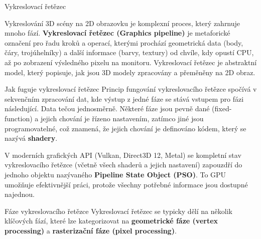 \chap Vykreslovací řetězec

Vykreslování 3D scény na 2D obrazovku je komplexní proces, který zahrnuje mnoho fází. {\bf Vykreslovací řetězec (Graphics pipeline)} je metaforické označení pro řadu kroků a operací, kterými prochází geometrická data (body, čáry, trojúhelníky) a další informace (barvy, textury) od chvíle, kdy opustí CPU, až po zobrazení výsledného pixelu na monitoru. Vykreslovací řetězec je abstraktní model, který popisuje, jak jsou 3D modely zpracovány a přeměněny na 2D obraz. 

\sec Jak fuguje vykreslovací řetězec
Princip fungování vykreslovacího řetězce spočívá v sekvenčním zpracování dat, kde výstup z jedné fáze se stává vstupem pro fázi následující. Data tečou jednosměrně. Některé fáze jsou pevně dané (fixed-function) a jejich chování je řízeno nastavením, zatímco jiné jsou programovatelné, což znamená, že jejich chování je definováno kódem, který se nazývá {\bf shadery}.

V moderních grafických API (Vulkan, Direct3D 12, Metal) se kompletní stav vykreslovacího řetězce (včetně všech shaderů a jejich nastavení) zapouzdří do jednoho objektu nazývaného {\bf Pipeline State Object (PSO)}. To GPU umožňuje efektivnější práci, protože všechny potřebné informace jsou dostupné najednou. 

\sec Fáze vykreslovacího řetězce
Vykreslovací řetězec se typicky dělí na několik klíčových fází, které lze kategorizovat na {\bf geometrické fáze (vertex processing)} a {\bf rasterizační fáze (pixel processing)}.


